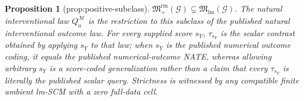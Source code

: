 \documentclass{article}
\newtheorem{proposition}{Proposition}
\begin{document}
\begin{proposition}[prop:positive-subclass]\label{prop:positive-subclass}
\(\mathfrak M_{+}^{\mathrm{rm}}(\mathcal G)\subsetneq\mathfrak M_{\mathrm{lm}}(\mathcal G)\). The natural interventional law \(Q_a^{\mathcal M}\) is the restriction to this subclass of the published natural interventional outcome law. For every supplied score \(s_Y\), \(\tau_{s_Y}\) is the scalar contrast obtained by applying \(s_Y\) to that law; when \(s_Y\) is the published numerical outcome coding, it equals the published numerical-outcome NATE, whereas allowing arbitrary \(s_Y\) is a score-coded generalization rather than a claim that every \(\tau_{s_Y}\) is literally the published scalar query. Strictness is witnessed by any compatible finite ambient lm-SCM with a zero full-data cell.
\end{proposition}
\end{document}
